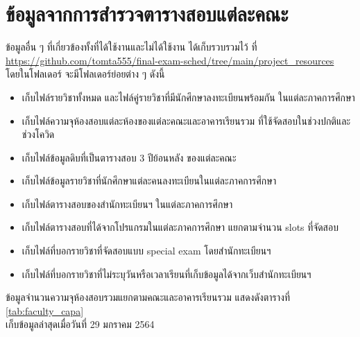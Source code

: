 \section{ข้อมูลจากการสำรวจตารางสอบแต่ละคณะ}
ข้อมูลอื่น ๆ ที่เกี่ยวข้องทั้งที่ได้ใช้งานและไม่ได้ใช้งาน ได้เก็บรวบรวมไว้ ที่ \url{https://github.com/tomta555/final-exam-sched/tree/main/project_resources}
\\ โดยในโฟลเดอร์  จะมีโฟลเดอร์ย่อยต่าง ๆ ดังนี้ 
\begin{itemize}
  \item {} เก็บไฟล์รายวิชาทั้งหมด และไฟล์คู่รายวิชาที่มีนักศึกษาลงทะเบียนพร้อมกัน ในแต่ละภาคการศึกษา
  \item {} เก็บไฟล์ความจุห้องสอบแต่ละห้องของแต่ละคณะและอาคารเรียนรวม ที่ใช้จัดสอบในช่วงปกติและช่วงโควิด
  \item {} เก็บไฟล์ข้อมูลดิบที่เป็นตารางสอบ 3 ปีย้อนหลัง ของแต่ละคณะ
  \item {} เก็บไฟล์ข้อมูลรายวิชาที่นักศึกษาแต่ละคนลงทะเบียนในแต่ละภาคการศึกษา
  \item {} เก็บไฟล์ตารางสอบของสำนักทะเบียนฯ ในแต่ละภาคการศึกษา
  \item {} เก็บไฟล์ตารางสอบที่ได้จากโปรแกรมในแต่ละภาคการศึกษา แยกตามจำนวน slots ที่จัดสอบ
  \item {} เก็บไฟล์ที่บอกรายวิชาที่จัดสอบแบบ special exam โดยสำนักทะเบียนฯ
  \item {} เก็บไฟล์ที่บอกรายวิชาที่ไม่ระบุวันหรือเวลาเรียนที่เก็บข้อมูลได้จากเว็บสำนักทะเบียนฯ
\end{itemize}

\noindent ข้อมูลจำนวนความจุห้องสอบรวมแยกตามคณะและอาคารเรียนรวม แสดงดังตารางที่ \ref{tab:faculty_capa} \\ เก็บข้อมูลล่าสุดเมื่อวันที่ 29 มกราคม 2564

